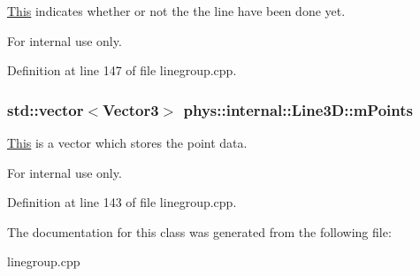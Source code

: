 \hyperlink{structThis}{This} indicates whether or not the the line have been done yet. 

\begin{DoxyInternal}{For internal use only.}
\end{DoxyInternal}


Definition at line 147 of file linegroup.cpp.

\hypertarget{classphys_1_1internal_1_1Line3D_acb6b813e2d713dbad02fe5a5ca1af97e}{
\subsubsection[{mPoints}]{\setlength{\rightskip}{0pt plus 5cm}std::vector$<${\bf Vector3}$>$ {\bf phys::internal::Line3D::mPoints}}}
\label{d4/db5/classphys_1_1internal_1_1Line3D_acb6b813e2d713dbad02fe5a5ca1af97e}


\hyperlink{structThis}{This} is a vector which stores the point data. 

\begin{DoxyInternal}{For internal use only.}
\end{DoxyInternal}


Definition at line 143 of file linegroup.cpp.



The documentation for this class was generated from the following file:\begin{DoxyCompactItemize}
\item 
linegroup.cpp\end{DoxyCompactItemize}
